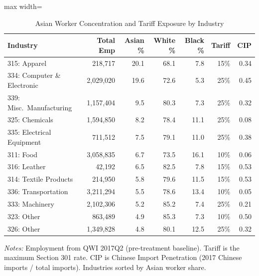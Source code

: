 \begin{table}[H]
\centering
\caption{Asian Worker Concentration and Tariff Exposure by Industry}
\label{tab:concentration}
\begin{threeparttable}
\begin{adjustbox}{max width=\textwidth}
\begin{tabular}{lrrrrrr}
\toprule
Industry & Total Emp & Asian \% & White \% & Black \% & Tariff & CIP \\
\midrule
315: Apparel & 218,717 & 20.1 & 68.1 & 7.8 & 15\% & 0.34 \\
334: Computer \& Electronic & 2,029,020 & 19.6 & 72.6 & 5.3 & 25\% & 0.45 \\
339: Misc.\ Manufacturing & 1,157,404 & 9.5 & 80.3 & 7.3 & 25\% & 0.32 \\
325: Chemicals & 1,594,850 & 8.2 & 78.4 & 11.1 & 25\% & 0.08 \\
335: Electrical Equipment & 711,512 & 7.5 & 79.1 & 11.0 & 25\% & 0.38 \\
311: Food & 3,058,835 & 6.7 & 73.5 & 16.1 & 10\% & 0.06 \\
316: Leather & 42,192 & 6.5 & 82.5 & 7.8 & 15\% & 0.53 \\
314: Textile Products & 214,950 & 5.8 & 79.6 & 11.5 & 15\% & 0.53 \\
336: Transportation & 3,211,294 & 5.5 & 78.6 & 13.4 & 10\% & 0.05 \\
333: Machinery & 2,102,306 & 5.2 & 85.2 & 7.4 & 25\% & 0.21 \\
323: Other & 863,489 & 4.9 & 85.3 & 7.3 & 10\% & 0.50 \\
326: Other & 1,349,828 & 4.8 & 80.1 & 12.5 & 25\% & 0.32 \\
\bottomrule
\end{tabular}
\end{adjustbox}
\begin{tablenotes}[flushleft]
\small
\item \textit{Notes:} Employment from QWI 2017Q2 (pre-treatment baseline). Tariff is the maximum Section 301 rate. CIP is Chinese Import Penetration (2017 Chinese imports / total imports). Industries sorted by Asian worker share.
\end{tablenotes}
\end{threeparttable}
\end{table}


